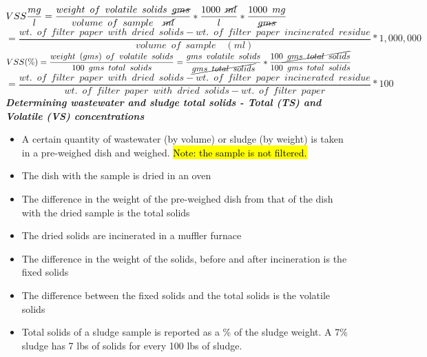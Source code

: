 $VSS \dfrac{mg}{l}=\dfrac{weight \enspace of \enspace volatile \enspace solids \enspace \cancel{gms}}{volume \enspace of \enspace sample \enspace \enspace \cancel{ml}}*\dfrac{1000 \enspace \cancel{ml}}{l}*\dfrac{1000 \enspace mg}{\cancel{gms}}$\\
\vspace{0.3cm}
\hspace{1.4cm}$=\dfrac{wt. \enspace of \enspace filter \enspace paper  \enspace with \enspace dried  \enspace solids - wt. \enspace of \enspace filter \enspace paper \enspace incinerated \enspace residue}{volume \enspace of \enspace sample \enspace \enspace (ml)}*1,000,000$\\
\vspace{0.3cm}
$VSS(\%)=\dfrac{weight \enspace (gms) \enspace of \enspace volatile \enspace solids}{100 \enspace gms \enspace total \enspace solids}=\dfrac{gms \enspace volatile \enspace solids}{\cancel{gms \enspace total \enspace solids}}*\dfrac{100 \cancel{\enspace gms \enspace total \enspace solids}}{100 \enspace gms \enspace total \enspace solids}$\\
\vspace{0.3cm}
\hspace{1.5cm}\small{$=\dfrac{wt. \enspace of \enspace filter \enspace paper  \enspace with \enspace dried  \enspace solids - wt. \enspace of \enspace filter \enspace paper \enspace incinerated \enspace residue}{wt. \enspace of \enspace filter \enspace paper  \enspace with \enspace dried  \enspace solids - wt. \enspace of \enspace filter \enspace paper}*100$}\\				

\newpage
	\textbf{\textit{Determining wastewater and sludge total solids - Total (TS) and Volatile (VS) concentrations}}			
\vspace{0.4cm}
\begin{itemize}
\setlength\itemsep{1em}
					\item A certain quantity of wastewater (by volume) or sludge (by weight) is taken in a pre-weighed dish and weighed.  \hl{Note:  the sample is not filtered.}
					\item The dish with the sample is dried in an oven
					\item The difference in the weight of the pre-weighed dish from that of the dish with the dried sample is the total solids
					\item The dried solids are incinerated in a muffler furnace
					\item The difference in the weight of the solids, before and after incineration is the fixed solids
					\item The difference between the fixed solids and the total solids is the volatile solids
					\item Total solids of a sludge sample is reported as a \% of the sludge weight.  A 7\% sludge has 7 lbs of solids for every 100 lbs of sludge.
				\end{itemize}
				
